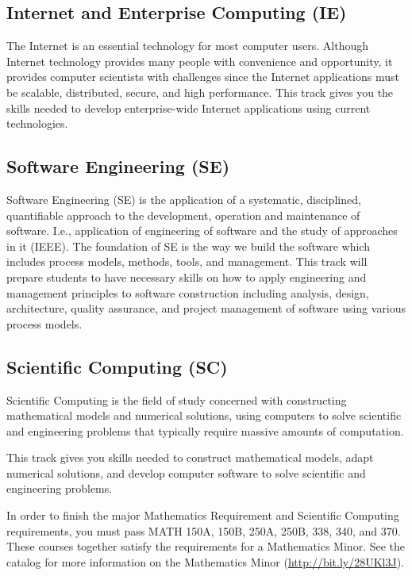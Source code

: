 \documentclass{book}
\newcommand{\IeTrackName}{Internet and Enterprise Computing (IE)}
\newcommand{\SeTrackName}{Software Engineering (SE)}
\newcommand{\ScTrackName}{Scientific Computing (SC)}
\begin{document}
\subsection{\IeTrackName}
\IeTrackIndex
The Internet is an essential technology for most computer users. Although Internet technology provides many people with convenience and opportunity, it provides computer scientists with challenges since the Internet applications must be scalable, distributed, secure, and high performance. This track gives you the skills needed to develop enterprise-wide Internet applications using current technologies.

\subsection{\SeTrackName}
\SeTrackIndex
Software Engineering (SE) is the application of a systematic, disciplined, quantifiable approach to the development, operation and maintenance of software. I.e., application of engineering of software and the study of approaches in it (IEEE).  The foundation of SE is the way we build the software which includes process models, methods, tools, and management.  This track will prepare students to have necessary skills on how to apply engineering and management principles to software construction including analysis, design, architecture, quality assurance, and project management of software using various process models.

\subsection{\ScTrackName}
\ScTrackIndex

Scientific Computing is the field of study concerned with constructing mathematical models and numerical solutions, using computers to solve scientific and engineering problems that typically require massive amounts of computation.

This track gives you skills needed to construct mathematical models, adapt numerical solutions, and develop computer software to solve scientific and engineering problems.

In order to finish the major Mathematics Requirement and Scientific Computing requirements, you must pass MATH 150A, 150B, 250A, 250B, 338, 340, and 370. These courses together satisfy the requirements for a Mathematics Minor. See the catalog for more information on the Mathematics Minor (\url{http://bit.ly/28UKl3J}).
\end{document}
